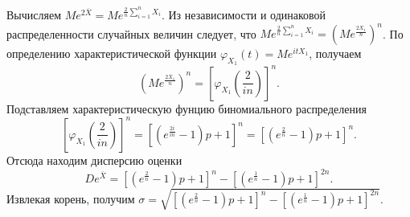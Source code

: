 Вычисляем $Me^{2 \overline{X}} = Me^{ \frac{2}{n} \sum \limits_{i = 1}^n X_i}$.
Из независимости и одинаковой распределенности случайных величин следует,
что $Me^{ \frac{2}{n} \sum \limits_{i = 1}^n X_i} = \left( Me^{ \frac{2X_1}{n}} \right)^n$.
По определению характеристической функции $ \varphi_{X_1} \left( t \right) = Me^{itX_1}$, получаем
$$ \left( Me^{ \frac{2X_1}{n}} \right)^n =
  \left[ \varphi_{X_1} \left( \frac{2}{in} \right) \right]^n.$$
Подставляем характеристическую фунцию биномиального распределения
$$ \left[ \varphi_{X_1} \left( \frac{2}{in} \right) \right]^n =
  \left[ \left( e^{ \frac{2i}{in}} - 1 \right) p + 1 \right]^n =
  \left[ \left( e^{ \frac{2}{n}} - 1 \right) p + 1 \right]^n.$$
Отсюда находим дисперсию оценки
$$De^{ \overline{X}} =
  \left[ \left( e^{ \frac{2}{n}} - 1 \right) p + 1 \right]^n -
  \left[ \left( e^{ \frac{1}{n}} - 1 \right) p + 1 \right]^{2n}.$$
Извлекая корень, получим
$ \sigma =
  \sqrt{
    \left[ \left( e^{ \frac{2}{n}} - 1 \right) p + 1 \right]^n -
    \left[ \left( e^{ \frac{1}{n}} - 1 \right) p + 1 \right]^{2n}
  }.$
